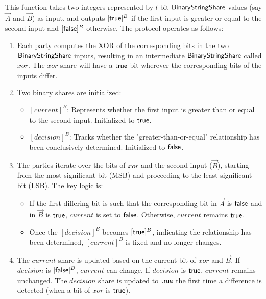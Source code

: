 This function takes two integers represented by $l$-bit ${\mathsf{BinaryStringShare}}$ values (say $\vec{A}$ and $\vec{B}$) as input, and outputs $[\mathsf{true}]^B$ if the first input is greater or equal to the second input and $[\mathsf{false}]^B$ otherwise. The protocol operates as follows:

\begin{enumerate}
    \item Each party computes the XOR of the corresponding bits in the two ${\mathsf{BinaryStringShare}}$ inputs, resulting in an intermediate ${\mathsf{BinaryStringShare}}$ called $xor$. The $xor$ share will have a $\mathsf{true}$ bit wherever the corresponding bits of the inputs differ.
    \item Two binary shares are initialized:
    \begin{itemize}
        \item $[current]^B$: Represents whether the first input is greater than or equal to the second input. Initialized to $\mathsf{true}$.
        \item $[decision]^B$: Tracks whether the "greater-than-or-equal" relationship has been conclusively determined. Initialized to $\mathsf{false}$.
    \end{itemize} 
    \item The parties iterate over the bits of $xor$ and the second input ($\vec{B}$), starting from the most significant bit (MSB) and proceeding to the least significant bit (LSB). The key logic is:
    \begin{itemize}
        \item If the first differing bit is such that the corresponding bit in $\vec{A}$ is $\mathsf{false}$ and in $\vec{B}$ is $\mathsf{true}$, $current$ is set to $\mathsf{false}$. Otherwise, $current$ remains $\mathsf{true}$.
        \item Once the $[decision]^B$ becomes $[\mathsf{true}]^B$, indicating the relationship has been determined, $[current]^B$ is fixed and no longer changes.
    \end{itemize}
    \item The $current$ share is updated based on the current bit of $xor$ and $\vec{B}$. If $decision$ is $[\mathsf{false}]^B$, $current$ can change. If $decision$ is $\mathsf{true}$, $current$ remains unchanged. The $decision$ share is updated to $\mathsf{true}$ the first time a difference is detected (when a bit of $xor$ is $\mathsf{true}$).
\end{enumerate}

